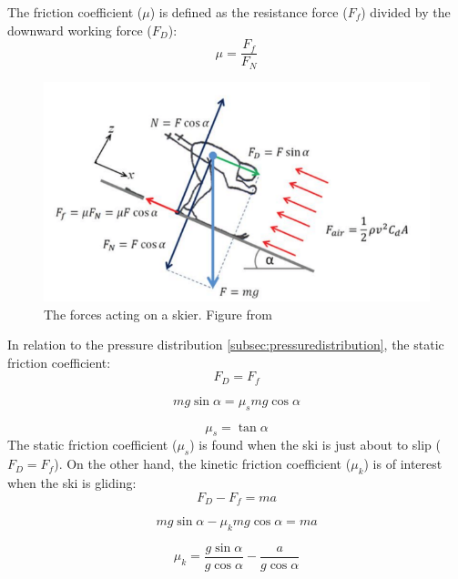 The friction coefficient ($\mu$) is defined as the resistance force ($F_f$) divided by the downward working force ($F_D$):
\begin{equation}\label{eqn:frictioneq}
    \mu = \frac{F_f}{F_N}
\end{equation}
\begin{figure}
    \centering
    \includegraphics[width=1\textwidth]{figures/forces.png}
    \caption{The forces acting on a skier. Figure from \citep{breitschadel_technical_2014}}
    \label{fig:glidingforces}
\end{figure}
In relation to the pressure distribution \ref{subsec:pressuredistribution}, the static friction coefficient:
\begin{equation}\label{eqn:friction}
    F_{D} = F_f 
\end{equation}

\begin{equation*}\label{eqn:staticfriction}
    mg\sin\alpha = \mu_smg\cos\alpha
\end{equation*}

\begin{equation}\label{eqn:staticfriction2}
    \mu_s = \tan\alpha
\end{equation}
The static friction coefficient ($\mu_s$) is found when the ski is just about to slip ($F_D = F_f$). On the other hand, the kinetic friction coefficient ($\mu_k$) is of interest when the ski is gliding:
\begin{equation}\label{eqn:kineticfriction}
    F_D - F_f = ma
\end{equation}

\begin{equation*}
    mg\sin\alpha - \mu_kmg\cos\alpha = ma
\end{equation*}

\begin{equation*}
    \mu_k = \frac{g\sin\alpha}{g\cos\alpha} - \frac{a}{g\cos\alpha}
\end{equation*}

